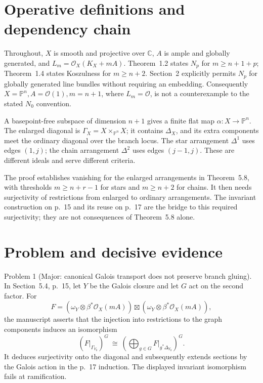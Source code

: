 \documentclass[10pt]{article}
\begin{document}
\section*{Operative definitions and dependency chain}
Throughout, \(X\) is smooth and projective over \(\mathbb C\), \(A\) is ample and globally generated, and \(L_m=\mathcal O_X(K_X+mA)\). Theorem 1.2 states \(N_p\) for \(m\ge n+1+p\); Theorem 1.4 states Koszulness for \(m\ge n+2\). Section 2 explicitly permits \(N_p\) for globally generated line bundles without requiring an embedding. Consequently \(X=\mathbb P^n,A=\mathcal O(1),m=n+1\), where \(L_m=\mathcal O\), is not a counterexample to the stated \(N_0\) convention.\par
A basepoint-free subspace of dimension \(n+1\) gives a finite flat map \(\alpha:X\to\mathbb P^n\). The enlarged diagonal is \(\Gamma_X=X\times_{\mathbb P^n}X\); it contains \(\Delta_X\), and its extra components meet the ordinary diagonal over the branch locus. The star arrangement \(\Delta^1\) uses edges \((1,j)\); the chain arrangement \(\Delta^2\) uses edges \((j-1,j)\). These are different ideals and serve different criteria.\par
The proof establishes vanishing for the enlarged arrangements in Theorem 5.8, with thresholds \(m\ge n+r-1\) for stars and \(m\ge n+2\) for chains. It then needs surjectivity of restrictions from enlarged to ordinary arrangements. The invariant construction on p. 15 and its reuse on p. 17 are the bridge to this required surjectivity; they are not consequences of Theorem 5.8 alone.\par
\section*{Problem and decisive evidence}
Problem 1 (Major: canonical Galois transport does not preserve branch gluing).  In Section 5.4, p. 15, let \(Y\) be the Galois closure and let \(G\) act on the second factor. For \[F=(\omega_Y\otimes\beta^*\mathcal O_X(mA))
       \boxtimes(\omega_Y\otimes\beta^*\mathcal O_X(mA)),\] the manuscript asserts that the injection into restrictions to the graph components induces an isomorphism \[(F|_{\Gamma_{Y_0}})^G
 \ \cong\
 \left(\bigoplus_{g\in G} F|_{g^*\Delta_{Y_0}}\right)^G.\] It deduces surjectivity onto the diagonal and subsequently extends sections by the Galois action in the p. 17 induction. The displayed invariant isomorphism fails at ramification.\par
\end{document}
